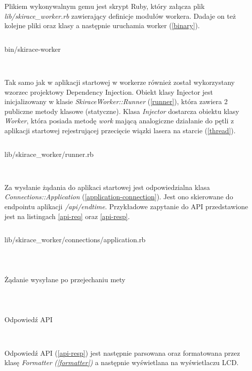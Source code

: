 \documentclass[11pt,a4paper, twoside]{article}
\begin{document}
Plikiem wykonywalnym gemu jest skrypt Ruby, który załącza plik \emph{lib/skirace\_worker.rb} zawierający definicje modułów workera. Dadaje on też kolejne pliki oraz klasy a następnie uruchamia worker (\ref{binary}). 

\begin{listing}
\inputminted[linenos=true]{ruby}{./src/binary}
\caption{bin/skirace-worker}
$\label{binary}$
\end{listing}

Tak samo jak w aplikacji startowej w workerze również został wykorzystany wzorzec projektowy Dependency Injection. Obiekt klasy Injector jest inicjalizowany w klasie \emph{SkiraceWorker::Runner} (\ref{runner}), która zawiera 2 publiczne metody klasowe (statyczne). Klasa \emph{Injector} dostarcza obiektu klasy \emph{Worker}, która posiada metodę \emph{work} mającą analogiczne działanie do pętli z aplikacji startowej rejestrującej przecięcie wiązki lasera na starcie (\ref{thread}).

\begin{listing}
\inputminted[linenos=true]{ruby}{./src/runner.rb}
\caption{lib/skirace\_worker/runner.rb}
$\label{runner}$
\end{listing}

Za wysłanie żądania do aplikaci startowej jest odpowiedzialna klasa \emph{Connections::Application} (\ref{application-connection}). Jest ono skierowane do endpointu aplikacji \emph{/api/endtime}. Przykładowe zapytanie do API przedstawione jest na listingach \ref{api-req} oraz \ref{api-resp}.

\begin{listing}[H]
\inputminted[linenos=true]{ruby}{./src/app-conn.rb}
\caption{lib/skirace\_worker/connections/application.rb}
$\label{application-connection}$
\end{listing}

\begin{listing}[H]
\inputminted{ruby}{./src/api-req}
\caption{Żądanie wysyłane po przejechaniu mety}
$\label{api-req}$
\end{listing}

\begin{listing}[H]
\inputminted{json}{./src/api-resp}
\caption{Odpowiedź API}
$\label{api-resp}$
\end{listing}

Odpowiedź API (\ref{api-resp}) jest następnie parsowana oraz formatowana przez klasę \emph{Formatter (\ref{formatter})} a następnie wyświetlana na wyświetlaczu LCD.
\end{document}
